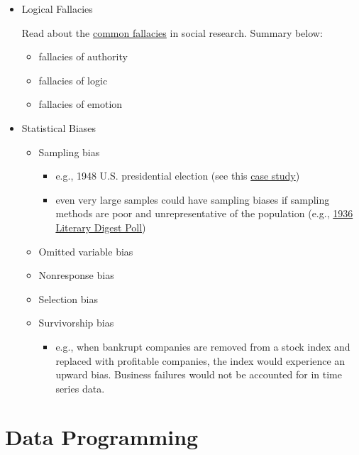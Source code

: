 \documentclass[]{book}
\providecommand{\tightlist}{%
  \setlength{\itemsep}{0pt}\setlength{\parskip}{0pt}}
\begin{document}
\begin{itemize}
\item
  Logical Fallacies

  Read about the \href{https://medium.com/@pnhoward/12-common-fallacies-used-in-social-research-9713e4d9bf48}{common fallacies} in social research. Summary below:

  \begin{itemize}
  \tightlist
  \item
    fallacies of authority
  \item
    fallacies of logic
  \item
    fallacies of emotion
  \end{itemize}
\item
  Statistical Biases

  \begin{itemize}
  \tightlist
  \item
    Sampling bias

    \begin{itemize}
    \tightlist
    \item
      e.g., 1948 U.S. presidential election (see this \href{https://www.math.upenn.edu/~deturck/m170/wk4/lecture/case2.html}{case study})
    \item
      even very large samples could have sampling biases if sampling methods are poor and unrepresentative of the population (e.g., \href{https://www.math.upenn.edu/~deturck/m170/wk4/lecture/case1.html}{1936 Literary Digest Poll})
    \end{itemize}
  \item
    Omitted variable bias
  \item
    Nonresponse bias
  \item
    Selection bias
  \item
    Survivorship bias

    \begin{itemize}
    \tightlist
    \item
      e.g., when bankrupt companies are removed from a stock index and replaced with profitable companies, the index would experience an upward bias. Business failures would not be accounted for in time series data.
    \end{itemize}
  \end{itemize}
\end{itemize}

\hypertarget{data-programming}{%
\chapter*{Data Programming}\label{data-programming}}
\end{document}
